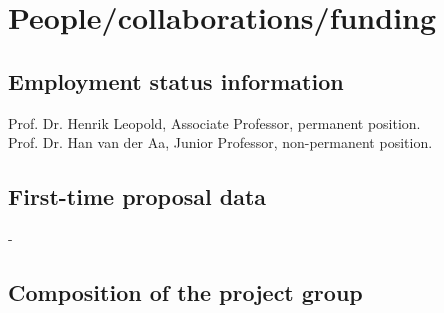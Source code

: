 \documentclass{scrartcl}
\begin{document}
\section{People/collaborations/funding}

\subsection{Employment status information}

Prof. Dr. Henrik Leopold, Associate Professor, permanent position.\\
Prof. Dr. Han van der Aa, Junior Professor, non-permanent position.


\subsection{First-time proposal data}

-

\subsection{Composition of the project group}

\end{document}
